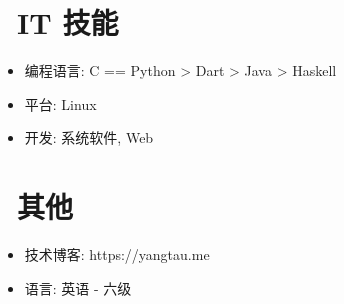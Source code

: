 \documentclass{resume}
\begin{document}

\section{\faCogs\ IT 技能}
\begin{itemize}[parsep=0.5ex]
  \item 编程语言: C == Python > Dart > Java > Haskell
  \item 平台: Linux
  \item 开发: 系统软件, Web 
\end{itemize}


\section{\faInfo\ 其他}
\begin{itemize}[parsep=0.5ex]
  \item 技术博客: https://yangtau.me
  \item 语言: 英语 - 六级
\end{itemize}

%
%
\end{document}

